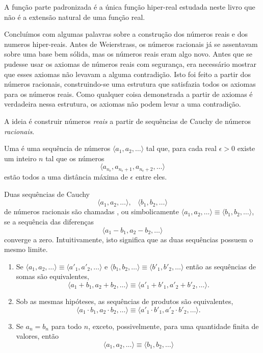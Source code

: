 
A função parte padronizada é a única função hiper-real estudada neste
livro que não é a extensão natural de uma função real.

Concluímos com algumas palavras sobre a construção dos números reais e dos
numeros hiper-reais. Antes de Weierstrass, os números racionais já se
assentavam sobre uma base bem sólida, mas os números reais eram algo novo.
Antes que se pudesse usar os axiomas de números reais com segurança, era
necessário mostrar que esses axiomas não levavam a alguma contradição.
Isto foi feito a partir dos números racionais, construindo-se uma estrutura
que satisfazia todos os axiomas para os números reais. Como qualquer coisa
demonstrada a partir de axiomas é verdadeira nessa estrutura, os axiomas
não podem levar a uma contradição.

A ideia é construir números \emph{reais} a partir de sequências de Cauchy
de números \emph{racionais}.

\begin{defin}
Uma  é uma sequência de
números $\langle a_1, a_2, \ldots \rangle$ tal que, para cada real
$\epsilon > 0$ existe um inteiro $n$ tal que os números
$$
  \langle a_{n_\epsilon}, a_{n_\epsilon + 1}, a_{n_\epsilon + 2}, \ldots \rangle
$$
estão todos a uma distância máxima de $\epsilon$ entre eles.
\end{defin}

Duas sequências de Cauchy
$$
  \langle a_1, a_2, \ldots \rangle, \;\;\; \langle b_1, b_2, \ldots \rangle
$$
de números racionais são chamadas
,
ou simbolicamente $\langle a_1, a_2, \ldots \rangle \equiv \langle b_1, b_2, \ldots \rangle$,
se a sequência das diferenças
$$\langle a_1 - b_1, a_2 - b_2, \ldots \rangle$$
converge a zero. Intuitivamente, isto significa que as duas sequências
possuem o mesmo limite.


\begin{enumerate}[(1)]
\item Se $\langle a_1 , a_2, \ldots \rangle \equiv \langle a'_1 , a'_2, \ldots \rangle$ e $\langle b_1 , b_2, \ldots \rangle \equiv \langle b'_1 , b'_2, \ldots \rangle$ então as sequências de somas são equivalentes,
$$
  \langle a_1+b_1 , a_2+b_2, \ldots \rangle \equiv \langle a'_1+b'_1 , a'_2+b'_2, \ldots \rangle.
$$
\item Sob as mesmas hipóteses, as sequências de produtos são equivalentes,
$$
  \langle a_1 \cdot b_1 , a_2 \cdot b_2, \ldots \rangle \equiv \langle a'_1 \cdot b'_1 , a'_2 \cdot b'_2, \ldots \rangle.
$$
\item Se $a_n = b_n$ para todo $n$, exceto, possivelmente, para uma quantidade
      finita de valores, então
      $$
        \langle a_1, a_2, \ldots \rangle \equiv
        \langle b_1, b_2, \ldots \rangle
      $$
\end{enumerate}

